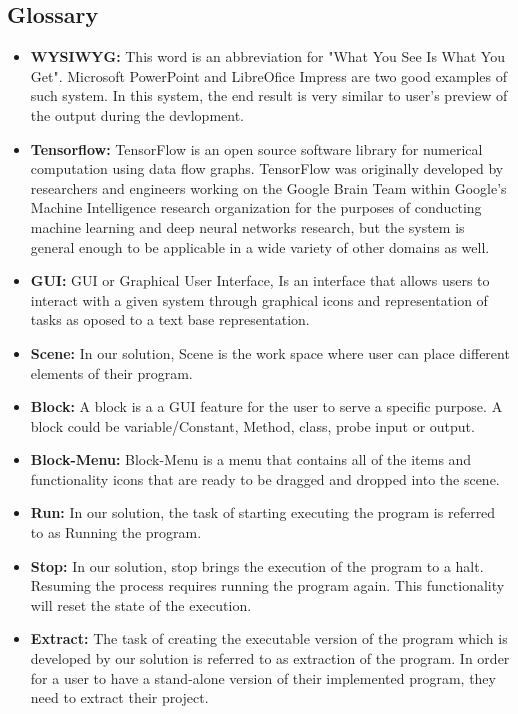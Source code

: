 \documentclass[journal,10pt,onecolumn,compsoc]{IEEEtran} \usepackage[margin=1.0in]{geometry} \usepackage{pdfpages} \usepackage{graphicx}
\begin{document}
\subsection{Glossary}
\begin{itemize}
	\item \textbf{WYSIWYG:}
		This word is an abbreviation for "What You See Is What You Get".
		Microsoft PowerPoint and LibreOfice Impress are two good examples of such system. 
		In this system, the end result is very similar to user's preview of the output during the devlopment.
	\item \textbf{Tensorflow:}
		TensorFlow is an open source software library for numerical computation using data flow graphs.
		TensorFlow was originally developed by researchers and engineers working on the Google Brain Team within
		Google's Machine Intelligence research organization for the purposes of conducting machine learning and 
		deep neural networks research, but the system is general enough to be applicable in a wide variety of other domains as well.
	\item \textbf{GUI:}
		GUI or Graphical User Interface, Is an interface that allows users to interact with a given system through graphical icons and representation of tasks as oposed to a text base representation.
	\item \textbf{Scene:}
		In our solution, Scene is the work space where user can place different elements of their program.
	\item \textbf{Block:}
		A block is a a GUI feature for the user to serve a specific purpose. A block could be variable/Constant, Method, class, probe input or output.
	\item \textbf{Block-Menu:}
		Block-Menu is a menu that contains all of the items and functionality icons that are ready to be dragged and dropped into the scene.
	\item \textbf{Run:}
		In our solution, the task of starting executing the program is referred to as Running the program.
	\item \textbf{Stop:}
		In our solution, stop brings the execution of the program to a halt. Resuming the process requires running the program again.
		This functionality will reset the state of the execution.
	\item \textbf{Extract:}
		The task of creating the executable version of the program which is developed by our solution is referred to as extraction of the program.
		In order for a user to have a stand-alone version of their implemented program, they need to extract their project.

\end{itemize}
\end{document}
